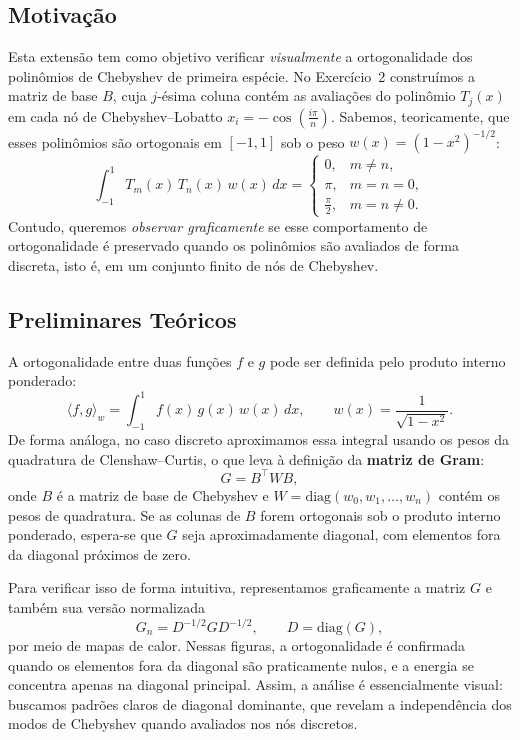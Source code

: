 \documentclass[11pt,a4paper]{article}
\begin{document}
\subsection*{Motivação}
Esta extensão tem como objetivo verificar \emph{visualmente} a ortogonalidade dos polinômios de Chebyshev
de primeira espécie. No Exercício~2 construímos a matriz de base $B$,
cuja $j$-ésima coluna contém as avaliações do polinômio $T_j(x)$
em cada nó de Chebyshev--Lobatto $x_i=-\cos\!\left(\tfrac{i\pi}{n}\right)$.
Sabemos, teoricamente, que esses polinômios são ortogonais em $[-1,1]$
sob o peso $w(x) = (1-x^2)^{-1/2}$:
\[
\int_{-1}^{1} T_m(x)\,T_n(x)\,w(x)\,dx =
\begin{cases}
0, & m \ne n,\\[4pt]
\pi, & m=n=0,\\[4pt]
\tfrac{\pi}{2}, & m=n\ne 0.
\end{cases}
\]
Contudo, queremos \emph{observar graficamente} se esse comportamento
de ortogonalidade é preservado quando os polinômios são avaliados de forma discreta,
isto é, em um conjunto finito de nós de Chebyshev.

\subsection*{Preliminares Teóricos}
A ortogonalidade entre duas funções $f$ e $g$ pode ser definida pelo produto interno
ponderado:
\[
\langle f, g \rangle_w = \int_{-1}^{1} f(x)\,g(x)\,w(x)\,dx,
\qquad w(x) = \frac{1}{\sqrt{1-x^2}}.
\]
De forma análoga, no caso discreto aproximamos essa integral usando os pesos
da quadratura de Clenshaw--Curtis, o que leva à definição da
\textbf{matriz de Gram}:
\[
G = B^\top W B,
\]
onde $B$ é a matriz de base de Chebyshev e
$W = \mathrm{diag}(w_0, w_1, \dots, w_n)$ contém os pesos de quadratura.
Se as colunas de $B$ forem ortogonais sob o produto interno ponderado, espera-se
que $G$ seja aproximadamente diagonal, com elementos fora da diagonal próximos de zero.

Para verificar isso de forma intuitiva, representamos graficamente
a matriz $G$ e também sua versão normalizada
\[
G_n = D^{-1/2} G D^{-1/2}, \qquad D=\mathrm{diag}(G),
\]
por meio de mapas de calor. Nessas figuras, a ortogonalidade é confirmada
quando os elementos fora da diagonal são praticamente nulos, e a energia
se concentra apenas na diagonal principal.
Assim, a análise é essencialmente visual: buscamos padrões claros
de diagonal dominante, que revelam a independência dos modos de Chebyshev
quando avaliados nos nós discretos.
\end{document}
